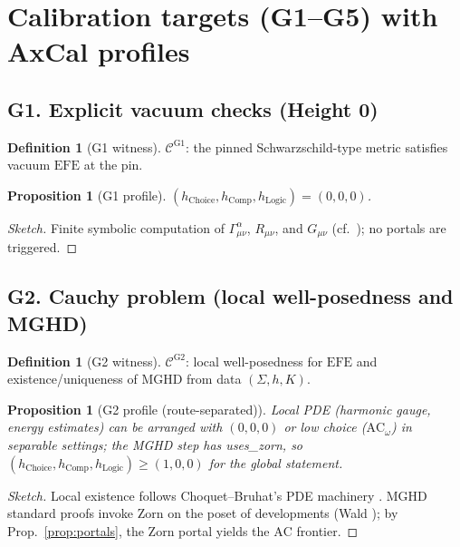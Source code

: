 \documentclass[11pt]{article}
\newtheorem{proposition}[theorem]{Proposition}
\theoremstyle{definition}
\newtheorem{definition}[theorem]{Definition}
\theoremstyle{remark}
\newcommand{\AC}{\mathrm{AC}}
\newcommand{\ACw}{\mathrm{AC}_\omega}
\newcommand{\hChoice}{h_{\mathrm{Choice}}}    %
\newcommand{\hComp}{h_{\mathrm{Comp}}}        %
\newcommand{\hLogic}{h_{\mathrm{Logic}}}      %
\newcommand{\EFE}{\mathrm{EFE}} %
\begin{document}
\section{Calibration targets (G1--G5) with AxCal profiles}
\subsection*{G1. Explicit vacuum checks (Height 0)}
\begin{definition}[G1 witness]
$\mathcal{C}^{\mathrm{G1}}$: the pinned Schwarzschild-type metric satisfies vacuum $\EFE$ at the pin.
\end{definition}
\begin{proposition}[G1 profile]\label{prop:G1}
$(\hChoice,\hComp,\hLogic)=(0,0,0)$.
\end{proposition}
\begin{proof}[Sketch]
Finite symbolic computation of $\Gamma^\alpha_{\mu\nu}$, $R_{\mu\nu}$, and $G_{\mu\nu}$ (cf.\ \cite[§B.4]{Wald1984}); no portals are triggered.
\end{proof}

\subsection*{G2. Cauchy problem (local well-posedness and MGHD)}
\begin{definition}[G2 witness]
$\mathcal{C}^{\mathrm{G2}}$: local well-posedness for $\EFE$ and existence/uniqueness of MGHD from data $(\Sigma,h,K)$.
\end{definition}
\begin{proposition}[G2 profile (route-separated)]\label{prop:G2}
Local PDE (harmonic gauge, energy estimates) can be arranged with $(0,0,0)$ or low choice ($\ACw$) in separable settings; the MGHD step has \textsf{uses\_zorn}, so $(\hChoice,\hComp,\hLogic)\ge(1,0,0)$ for the global statement.
\end{proposition}
\begin{proof}[Sketch]
Local existence follows Choquet--Bruhat's PDE machinery \cite{ChoquetBruhat2009}. MGHD standard proofs invoke Zorn on the poset of developments (Wald \cite[Thm.~10.1.2]{Wald1984}); by Prop.~\ref{prop:portals}, the Zorn portal yields the $\AC$ frontier.
\end{proof}
\end{document}

